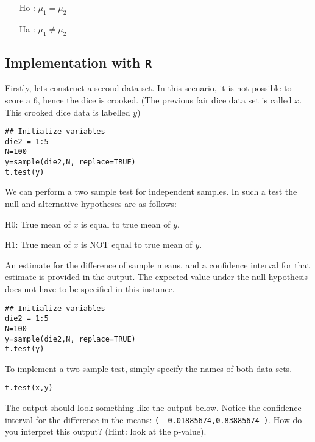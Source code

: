        \begin{itemize}
       \item[Ho] : $\mu_1 = \mu_2$
       \item[Ha] : $\mu_1 \neq \mu_2$
       \end{itemize}

\subsection{Implementation with \texttt{R}}
Firstly, lets construct a second data set. In this scenario, it is not possible to score a 6, hence the dice is crooked.
(The previous fair dice data set is called $x$. This crooked dice data is labelled $y$)
\begin{framed}
\begin{verbatim}
## Initialize variables
die2 = 1:5
N=100
y=sample(die2,N, replace=TRUE)
t.test(y)
\end{verbatim}
\end{framed}

We can perform a two sample test for independent samples. In such a test the null and alternative hypotheses are as follows:

H0: True mean of $x$ is equal to true mean of $y$.

H1: True mean of $x$ is NOT equal to true mean of $y$.

An estimate for the difference of sample means, and a confidence interval for that estimate is provided in the output. The expected value under the null hypothesis does not have to be specified in this instance.

\begin{framed}
\begin{verbatim}
## Initialize variables
die2 = 1:5
N=100
y=sample(die2,N, replace=TRUE)
t.test(y)
\end{verbatim}
\end{framed}

To implement a two sample test, simply specify the names of both data sets.

\begin{framed}
\begin{verbatim}
t.test(x,y)
\end{verbatim}
\end{framed}
The output should look something like the output below. Notice the confidence interval for the difference in the means: \texttt{( -0.01885674,0.83885674 )}.
How do you interpret this output? (Hint: look at the p-value).

